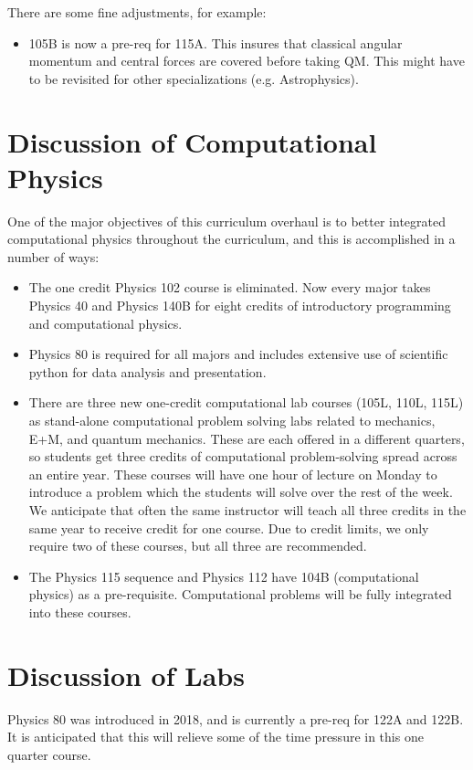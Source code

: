 \documentclass[12pt]{article}
\begin{document}
There are some fine adjustments, for example:
\begin{itemize}
\item 105B is now a pre-req for 115A.  This insures that classical angular momentum and central forces are covered before taking QM.  This might have to be revisited for other specializations (e.g. Astrophysics).
\end{itemize}

\section{Discussion of Computational Physics}
One of the major objectives of this curriculum overhaul is to better integrated computational physics throughout the curriculum, and this is accomplished in a number of ways:
\begin{itemize}
\item The one credit Physics 102 course is eliminated.  Now every major takes Physics 40 and Physics 140B for eight credits of introductory programming and computational physics. 
\item Physics 80 is required for all majors and includes extensive use of scientific python for data analysis and presentation.
\item There are three new one-credit computational lab courses (105L, 110L, 115L) as stand-alone computational problem solving labs related to mechanics, E+M, and quantum mechanics.  These are each offered in a different quarters, so students get three credits of computational problem-solving spread across an entire year.  These courses will have one hour of lecture on Monday to introduce a problem which the students will solve over the rest of the week.  We anticipate that often the same instructor will teach all three credits in the same year to receive credit for one course.  Due to credit limits, we only require two of these courses, but all three are recommended.
\item The Physics 115 sequence and Physics 112 have 104B (computational physics) as a pre-requisite.  Computational problems will be fully integrated into these courses.
\end{itemize}

\section{Discussion of Labs}

Physics 80 was introduced in 2018, and is currently a pre-req for 122A and 122B.  It is anticipated that this will relieve some of the time pressure in this one quarter course.
\end{document}
